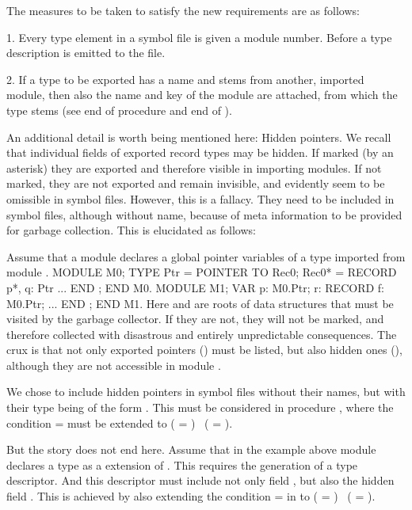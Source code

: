 The measures to be taken to satisfy the new requirements are as follows:

\item{1.} Every type element in a symbol file is given a module number. Before a type description is emitted to the file.
\item{2.} If a type to be exported has a name and stems from another, imported module, then also the name and key of the module are attached, from which the type stems (see end of procedure  and end of ).

An additional detail is worth being mentioned here: Hidden pointers. We recall that individual fields of exported record types may be hidden. If marked (by an asterisk) they are exported and therefore visible in importing modules. If not marked, they are not exported and remain invisible, and evidently seem to be omissible in symbol files. However, this is a fallacy. They need to be included in symbol files, although without name, because of meta information to be provided for garbage collection. This is elucidated as follows:

Assume that a module  declares a global pointer variables of a type imported from module .
\begintt
MODULE M0;
TYPE Ptr = POINTER TO Rec0;
Rec0* = RECORD p*, q: Ptr ... END ; END M0.
MODULE M1; VAR p: M0.Ptr;
r: RECORD f: M0.Ptr; ... END ; END M1.
\endtt
Here  and  are roots of data structures that must be visited by the garbage collector. If they are not, they will not be marked, and therefore collected with disastrous and entirely unpredictable consequences. The crux is that not only exported pointers () must be listed, but also hidden ones (), although they are not accessible in module .

We chose to include hidden pointers in symbol files without their names, but with their type being of the form . This must be considered in procedure , where the condition  =  must be extended to ( = ) \lor\ ( = ).

But the story does not end here. Assume that in the example above module  declares a type  as a  extension of . This requires the generation of a type descriptor. And this descriptor must include not only field , but also the hidden field . This is achieved by also extending the condition  =  in  to ( = ) \lor\ ( = ).

